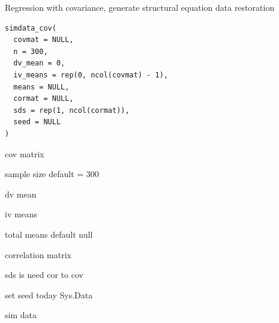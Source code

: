 \documentclass[a4paper]{book}
\begin{document}
%
\begin{Description}
Regression with covariance, generate structural equation data restoration
\end{Description}
%
\begin{Usage}
\begin{verbatim}
simdata_cov(
  covmat = NULL,
  n = 300,
  dv_mean = 0,
  iv_means = rep(0, ncol(covmat) - 1),
  means = NULL,
  cormat = NULL,
  sds = rep(1, ncol(cormat)),
  seed = NULL
)
\end{verbatim}
\end{Usage}
%
\begin{Arguments}
\begin{ldescription}
\item[\code{covmat}] cov matrix

\item[\code{n}] sample size default = 300

\item[\code{dv\_mean}] dv mean

\item[\code{iv\_means}] iv means

\item[\code{means}] total means default null

\item[\code{cormat}] correlation matrix

\item[\code{sds}] sds is need cor to cov

\item[\code{seed}] set seed today Sys.Data
\end{ldescription}
\end{Arguments}
%
\begin{Value}
sim data
\end{Value}
%
\end{document}
